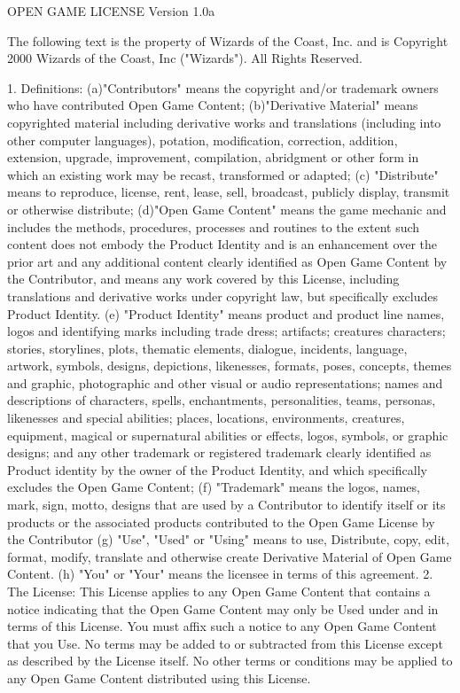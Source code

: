 {OPEN GAME LICENSE Version 1.0a

The following text is the property of Wizards of the Coast, Inc. and is Copyright 2000 Wizards of the Coast, Inc ("Wizards"). All Rights Reserved.

1. Definitions: (a)"Contributors" means the copyright and/or trademark owners who have contributed Open Game Content; (b)"Derivative Material" means copyrighted material including derivative works and translations (including into other computer languages), potation, modification, correction, addition, extension, upgrade, improvement, compilation, abridgment or other form in which an existing work may be recast, transformed or adapted; (c) "Distribute" means to reproduce, license, rent, lease, sell, broadcast, publicly display, transmit or otherwise distribute; (d)"Open Game Content" means the game mechanic and includes the methods, procedures, processes and routines to the extent such content does not embody the Product Identity and is an enhancement over the prior art and any additional content clearly identified as Open Game Content by the Contributor, and means any work covered by this License, including translations and derivative works under copyright law, but specifically excludes Product Identity. (e) "Product Identity" means product and product line names, logos and identifying marks including trade dress; artifacts; creatures characters; stories, storylines, plots, thematic elements, dialogue, incidents, language, artwork, symbols, designs, depictions, likenesses, formats, poses, concepts, themes and graphic, photographic and other visual or audio representations; names and descriptions of characters, spells, enchantments, personalities, teams, personas, likenesses and special abilities; places, locations, environments, creatures, equipment, magical or supernatural abilities or effects, logos, symbols, or graphic designs; and any other trademark or registered trademark clearly identified as Product identity by the owner of the Product Identity, and which specifically excludes the Open Game Content; (f) "Trademark" means the logos, names, mark, sign, motto, designs that are used by a Contributor to identify itself or its products or the associated products contributed to the Open Game License by the Contributor (g) "Use", "Used" or "Using" means to use, Distribute, copy, edit, format, modify, translate and otherwise create Derivative Material of Open Game Content. (h) "You" or "Your" means the licensee in terms of this agreement.
2. The License: This License applies to any Open Game Content that contains a notice indicating that the Open Game Content may only be Used under and in terms of this License. You must affix such a notice to any Open Game Content that you Use. No terms may be added to or subtracted from this License except as described by the License itself. No other terms or conditions may be applied to any Open Game Content distributed using this License.
}
